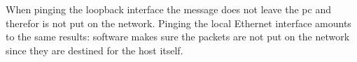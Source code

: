 When pinging the loopback interface the message does not leave the pc and therefor is not put on the network. Pinging the local Ethernet interface amounts to the same results: software makes sure the packets are not put on the network since they are destined for the host itself.